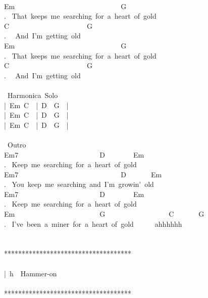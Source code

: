 {\\
Em\ \ \ \ \ \ \ \ \ \ \ \ \ \ \ \ \ \ \ \ \ \ \ \ \ \ \ \ \ \ G\\
. \ That\ keeps\ me\ searching\ for\ a\ heart\ of\ gold\\
C\ \ \ \ \ \ \ \ \ \ \ \ \ \ \ \ \ \ \ \ \ \ G\\
. \ \ And\ I'm\ getting\ old\\
Em\ \ \ \ \ \ \ \ \ \ \ \ \ \ \ \ \ \ \ \ \ \ \ \ \ \ \ \ \ \ G\\
. \ That\ keeps\ me\ searching\ for\ a\ heart\ of\ gold\\
C\ \ \ \ \ \ \ \ \ \ \ \ \ \ \ \ \ \ \ \ \ \ G\\
. \ \ And\ I'm\ getting\ old\\
\\
\lbrack\ Harmonica\ Solo\rbrack\\
|\ Em\ C\ \ |\ D\ \ G\ \ |\\
|\ Em\ C\ \ |\ D\ \ G\ \ |\\
|\ Em\ C\ \ |\ D\ \ G\ \ |\\
\\
\lbrack\ Outro\rbrack\\
Em7\ \ \ \ \ \ \ \ \ \ \ \ \ \ \ \ \ \ \ \ \ \ \ D\ \ \ \ \ \ \ \ Em\\
. \ Keep\ me\ searching\ for\ a\ heart\ of\ gold\\
Em7\ \ \ \ \ \ \ \ \ \ \ \ \ \ \ \ \ \ \ \ \ \ \ \ \ \ \ \ \ D\ \ \ \ \ \ \ Em\\
. \ You\ keep\ me\ searching\ and\ I'm\ growin'\ old\\
Em7\ \ \ \ \ \ \ \ \ \ \ \ \ \ \ \ \ \ \ \ \ \ \ D\ \ \ \ \ \ \ \ Em\\
. \ Keep\ me\ searching\ for\ a\ heart\ of\ gold\\
Em\ \ \ \ \ \ \ \ \ \ \ \ \ \ \ \ \ \ \ \ \ \ \ \ G\ \ \ \ \ \ \ \ \ \ \ \ \ \ \ \ \ \ C\ \ \ \ \ \ \ G\\
. \ I've\ been\ a\ miner\ for\ a\ heart\ of\ gold\ \ \ \ \ \ ahhhhhh\\
\\
\\
************************************\\
\\
|\ h\ \ Hammer-on\\
\\
************************************\ }
